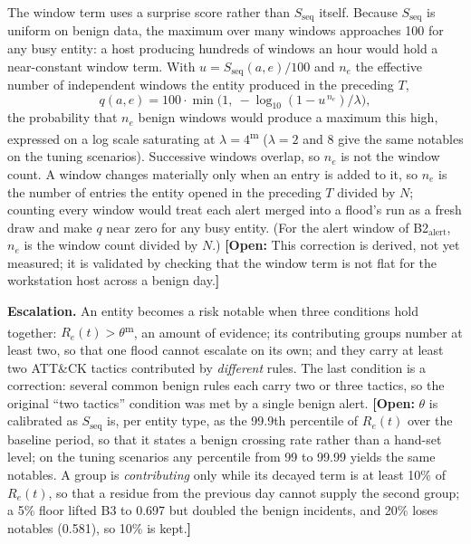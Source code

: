 \documentclass[conference]{IEEEtran}
\newcommand{\open}[1]{\textcolor{blue!70!black}{\textbf{[Open:} #1\textbf{]}}}
\newcommand{\meas}{\textsuperscript{\textcolor{green!45!black}{m}}}    %
\begin{document}
The window term uses a surprise score rather than $S_\mathrm{seq}$ itself. Because $S_\mathrm{seq}$ is uniform on benign data, the maximum over many windows approaches 100 for any busy entity: a host producing hundreds of windows an hour would hold a near-constant window term. With $u = S_\mathrm{seq}(a,e)/100$ and $n_e$ the effective number of independent windows the entity produced in the preceding $T$,
\begin{equation}
q(a, e) = 100 \cdot \min\!\big(1,\ -\log_{10}(1 - u^{\,n_e}) / \lambda \big),
\end{equation}
the probability that $n_e$ benign windows would produce a maximum this high, expressed on a log scale saturating at $\lambda = 4$\meas{} ($\lambda = 2$ and 8 give the same notables on the tuning scenarios). Successive windows overlap, so $n_e$ is not the window count. A window changes materially only when an entry is added to it, so $n_e$ is the number of entries the entity opened in the preceding $T$ divided by $N$; counting every window would treat each alert merged into a flood's run as a fresh draw and make $q$ near zero for any busy entity. (For the alert window of B2$_\mathrm{alert}$, $n_e$ is the window count divided by $N$.) \open{This correction is derived, not yet measured; it is validated by checking that the window term is not flat for the workstation host across a benign day.}

\textbf{Escalation.} An entity becomes a risk notable when three conditions hold together: $R_e(t) > \theta$\meas{}, an amount of evidence; its contributing groups number at least two, so that one flood cannot escalate on its own; and they carry at least two ATT\&CK tactics contributed by \emph{different} rules. The last condition is a correction: several common benign rules each carry two or three tactics, so the original ``two tactics'' condition was met by a single benign alert. \open{$\theta$ is calibrated as $S_\mathrm{seq}$ is, per entity type, as the 99.9th percentile of $R_e(t)$ over the baseline period, so that it states a benign crossing rate rather than a hand-set level; on the tuning scenarios any percentile from 99 to 99.99 yields the same notables. A group is \emph{contributing} only while its decayed term is at least 10\% of $R_e(t)$, so that a residue from the previous day cannot supply the second group; a 5\% floor lifted B3 to 0.697 but doubled the benign incidents, and 20\% loses notables (0.581), so 10\% is kept.}
\end{document}
